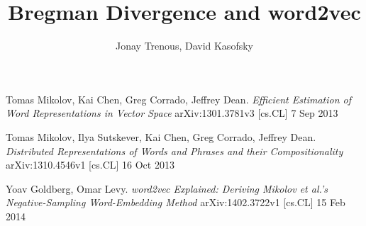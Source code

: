 \documentclass[]{article}
\title{Bregman Divergence and word2vec}
\author{Jonay Trenous, David Kasofsky}
\begin{document}
\maketitle

\begin{abstract}


\end{abstract}

\section{}

\begin{thebibliography}{1}
 Tomas Mikolov, Kai Chen, Greg Corrado, Jeffrey Dean. {\em Efficient Estimation of Word Representations in Vector Space} arXiv:1301.3781v3 [cs.CL] 7 Sep 2013

 Tomas Mikolov, Ilya Sutskever, Kai Chen, Greg Corrado, Jeffrey Dean. {\em Distributed Representations of Words and Phrases and their Compositionality} arXiv:1310.4546v1  [cs.CL]  16 Oct 2013

 Yoav Goldberg, Omar Levy. {\em word2vec Explained: Deriving Mikolov et al.'s Negative-Sampling Word-Embedding Method} arXiv:1402.3722v1  [cs.CL]  15 Feb 2014

\end{thebibliography}
\end{document}
